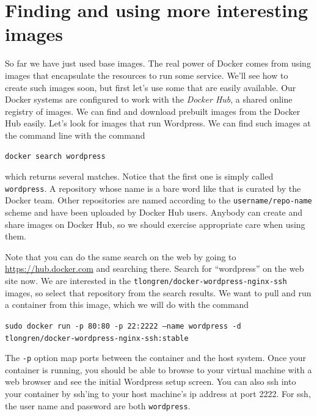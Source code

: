 \documentclass{article}
\begin{document}
\section{Finding and using more interesting images}
So far we have just used base images.  The real power of Docker comes from using images that encapsulate the resources to run some service.  We'll see how to create such images soon, but first let's use some that are easily available.  Our Docker systems are configured to work with the \emph{Docker Hub}, a shared online registry of images.  We can find and download prebuilt images from the Docker Hub easily.  Let's look for images that run Wordpress.  We can find such images at the command line with the command

\texttt{docker search wordpress}

which returns several matches.  Notice that the first one is simply called \texttt{wordpress}.  A repository whose name is a bare word like that is curated by the Docker team.  Other repositories are named according to the \texttt{username/repo-name} scheme and have been uploaded by Docker Hub users. Anybody can create and share images on Docker Hub, so we should exercise appropriate care when using them.

Note that you can do the same search on the web by going to \url{https://hub.docker.com} and searching there.  Search for ``wordpress'' on the web site now.  We are interested in the \texttt{tlongren/docker-wordpress-nginx-ssh} images, so select that repository from the search results.  We want to pull and run a container from this image, which we will do with the command

\texttt{sudo docker run -p 80:80 -p 22:2222 --name wordpress -d tlongren/docker-wordpress-nginx-ssh:stable}

The \texttt{-p} option map ports between the container and the host system. Once your container is running, you should be able to browse to your virtual machine with a web browser and see the initial Wordpress setup screen.  You can also ssh into your container by ssh'ing to your host machine's ip address at port 2222.  For ssh, the user name and password are both \texttt{wordpress}.
\end{document}
